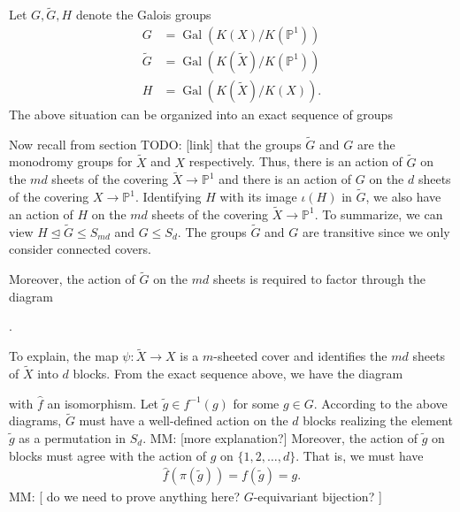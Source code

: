 \documentclass[oneside, reqno, 12pt]{amsart}
\theoremstyle{definition}
\theoremstyle{remark}
\newcommand{\wt}{\widetilde}
\newcommand{\PP}{\mathbb P}
\DeclareMathOperator{\Gal}{Gal}
\newcommand{\mm}[1]{{\color{blue} \sf MM: [#1]}}
\newcommand{\todo}[1]{{\color{red} \sf TODO: [#1]}}
\begin{document}
{{\begin{center}
    \end{center}
    Let $G,\widetilde{G}, H$ denote the Galois groups
    \begin{align*}
      G &= \Gal(K(X)/K(\PP^1))\\
      \widetilde{G} &= \Gal(K(\widetilde{X})/K(\PP^1))\\
      H &= \Gal(K(\widetilde{X})/K(X)).
    \end{align*}
    The above situation can be organized into an exact sequence of groups
    \begin{center}
    \end{center}
    Now recall from section \todo{link}
    that the groups $\widetilde{G}$ and $G$ are
    the monodromy groups for $\widetilde{X}$ and $X$ respectively.
    Thus,
    there is an action of $\widetilde{G}$
    on the $md$ sheets of the covering $\widetilde{X}\to\PP^1$
    and there is an action of $G$ on the $d$ sheets of the covering $X\to\PP^1$.
    Identifying $H$ with its image $\iota(H)$ in $\widetilde{G}$,
    we also have an action of $H$ on the $md$ sheets of the covering $\widetilde{X}\to\PP^1$.
    To summarize,
    we can view $H\trianglelefteq\widetilde{G}\leq S_{md}$ and $G\leq S_d$.
    The groups $\widetilde{G}$ and $G$ are transitive since
    we only consider connected covers.
    \par
    Moreover, the action of $\widetilde{G}$ on the $md$ sheets is required to
    factor through the diagram
    \begin{center}
      .
    \end{center}
    To explain,
    the map $\psi:\widetilde{X}\to X$ is a $m$-sheeted cover
    and identifies the $md$ sheets of $\widetilde{X}$ into $d$ blocks.
    From the exact sequence above,
    we have the diagram
    \begin{center}
    \end{center}
    with $\hat{f}$ an isomorphism.
    Let $\wt{g}\in f^{-1}(g)$ for some $g\in G$.
    According to the above diagrams,
    $\wt{G}$ must have a well-defined
    action on the $d$ blocks
    realizing the element $\wt{g}$
    as a permutation in $S_d$.
    \mm{more explanation?}
    Moreover,
    the action of $\wt{g}$ on blocks
    must agree with the action of $g$
    on $\{1,2,\dots,d\}$.
    That is,
    we must have
    \begin{align*}
      \hat{f}(\pi(\wt{g})) = f(\wt{g}) = g.
    \end{align*}
    \mm{
      do we need to prove anything here?
      $G$-equivariant bijection?
    }
  }
}
\end{document}

